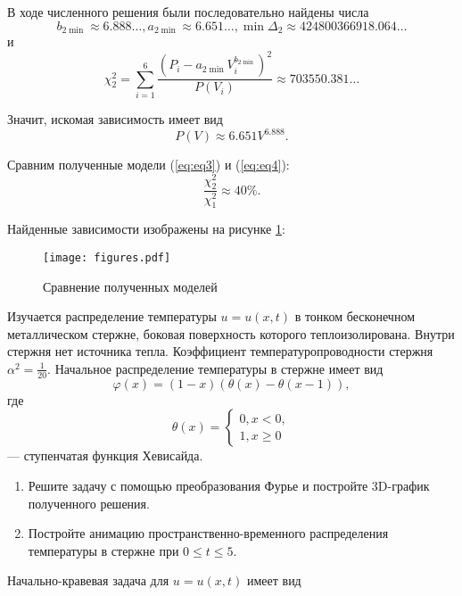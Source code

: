 В ходе численного решения были последовательно найдены числа
\[ b_{2 \min} \approx 6.888\ldots, a_{2 \min} \approx  6.651\ldots, \min \Delta _2 \approx 424800366918.064\ldots\]
и
\[ \chi _2^2 = \sum \limits _{i=1}^6 \dfrac{(P_i - a_{2 \min} V_i^{b_{2 \min}})^2}{P(V_i)} \approx 703550.381\ldots \]

Значит, искомая зависимость имеет вид
\begin{equation} \label{eq:eq4}
P(V) \approx 6.651 V^{6.888}.
\end{equation}

Сравним полученные модели (\ref{eq:eq3}) и (\ref{eq:eq4}):
\[
\dfrac{\chi _2^2}{\chi _1^2} \approx 40\%.
\]

Найденные зависимости изображены на рисунке \ref{fig:fig-2}:

\begin{figure}[h]
\vspace{5pt}
\centering
\texttt{[image: figures.pdf]}
\caption{Сравнение полученных моделей}
\label{fig:fig-2}
\vspace{5pt}
\end{figure}

 Изучается распределение температуры $u=u(x, t)$ в тонком бесконечном металлическом стержне, боковая поверхность которого теплоизолирована. Внутри стержня нет источника тепла. Коэффициент температуропроводности стержня $\alpha^2 = \frac{1}{20}$. Начальное распределение температуры в стержне имеет вид
\[
\varphi (x)=(1-x)(\theta (x)- \theta (x-1)),
\]
где 
\[
\theta (x) =
\begin{cases}
0, x < 0,\\
1, x \ge 0
\end{cases}
\]
--- ступенчатая функция Хевисайда.\\

 \begin{enumerate}
\item Решите задачу с помощью преобразования Фурье и постройте 3D-график полученного решения.
\item Постройте анимацию пространственно-временного распределения температуры в стержне при $0 \le t \le 5$.
\end{enumerate}

Начально-кравевая задача для $u=u(x, t)$ имеет вид

